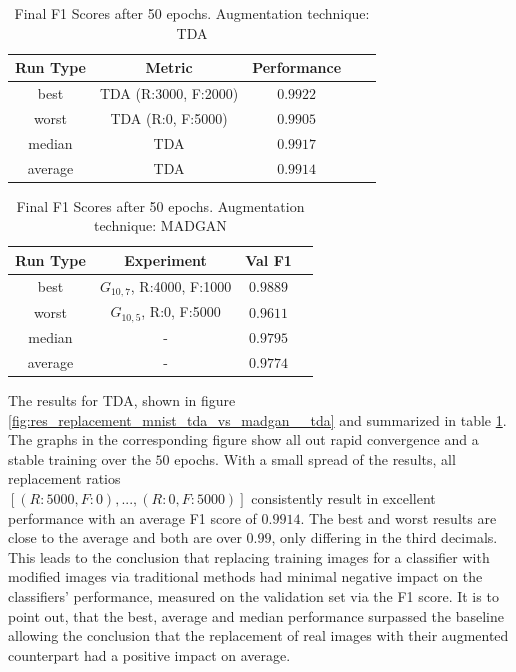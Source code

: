 \begin{table}[H]
	\centering
	\vspace{-1.5em}
	\begin{tabular}{|c|c|c|c|c|}
		\hline
		Run Type & Metric & Performance \\ \hline
		best & TDA (R:3000, F:2000) & $0.9922$\\ \hline
		worst & TDA (R:0, F:5000) & $0.9905$\\ \hline
		median & TDA & $0.9917$\\ \hline
		average & TDA & $0.9914$
		\\ \hline
	\end{tabular}
    \caption{Final F1 Scores after 50 epochs. Augmentation technique: TDA}
        \label{tab:res_replacement_mnist_tda_vs_madgan__tda}
\end{table}
\begin{table}[H]
	\vspace{-1.5em}
	\centering
	\begin{tabular}{|c|c|c|c|}
		\hline
		Run Type & Experiment & Val F1 \\ \hline
		best & \(G_{10, 7}\), R:4000, F:1000 & $0.9889$\\ \hline
		worst & \(G_{10, 5}\), R:0, F:5000 & $0.9611$\\ \hline
		median & - & $0.9795$\\ \hline
		average & - & $0.9774$
		\\ \hline
	\end{tabular}
    \caption{Final F1 Scores after 50 epochs. Augmentation technique: MADGAN}
        \label{tab:res_replacement_mnist_tda_vs_madgan__madgan}
\end{table}

The results for TDA, shown in figure \ref{fig:res_replacement_mnist_tda_vs_madgan__tda} and summarized in table \ref{tab:res_replacement_mnist_tda_vs_madgan__tda}. The graphs in the corresponding figure show all out rapid convergence and a stable training over the $50$ epochs. With a small spread of the results, all replacement ratios \\\(\left[ (R:5000, F:0), ..., (R:0, F:5000) \right]\) consistently result in excellent performance with an average F1 score of $0.9914$. The best and worst results are close to the average and both are over $0.99$, only differing in the third decimals. This leads to the conclusion that replacing training images for a classifier with modified images via traditional methods had minimal negative impact on the classifiers' performance, measured on the validation set via the F1 score. It is to point out, that the best, average and median performance surpassed the baseline allowing the conclusion that the replacement of real images with their augmented counterpart had a positive impact on average.

